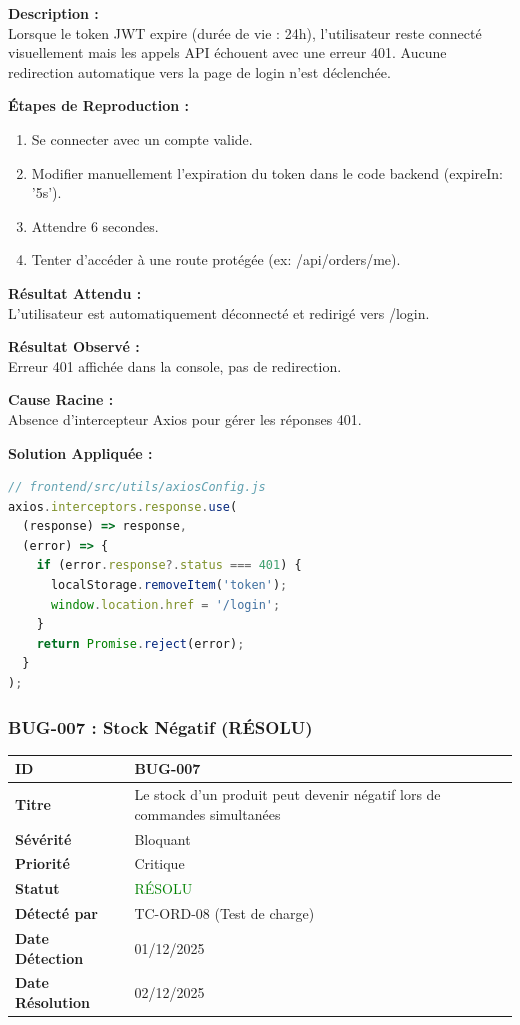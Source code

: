 \documentclass[12pt,a4paper]{article}
\begin{document}
\vspace{0.5cm}
\textbf{Description :} \\
Lorsque le token JWT expire (durée de vie : 24h), l'utilisateur reste connecté visuellement mais les appels API échouent avec une erreur 401. Aucune redirection automatique vers la page de login n'est déclenchée.

\vspace{0.5cm}
\textbf{Étapes de Reproduction :}
\begin{enumerate}
    \item Se connecter avec un compte valide.
    \item Modifier manuellement l'expiration du token dans le code backend (expireIn: '5s').
    \item Attendre 6 secondes.
    \item Tenter d'accéder à une route protégée (ex: /api/orders/me).
\end{enumerate}

\textbf{Résultat Attendu :} \\
L'utilisateur est automatiquement déconnecté et redirigé vers /login.

\vspace{0.5cm}
\textbf{Résultat Observé :} \\
Erreur 401 affichée dans la console, pas de redirection.

\vspace{0.5cm}
\textbf{Cause Racine :} \\
Absence d'intercepteur Axios pour gérer les réponses 401.

\vspace{0.5cm}
\textbf{Solution Appliquée :}
\begin{lstlisting}[language=JavaScript]
// frontend/src/utils/axiosConfig.js
axios.interceptors.response.use(
  (response) => response,
  (error) => {
    if (error.response?.status === 401) {
      localStorage.removeItem('token');
      window.location.href = '/login';
    }
    return Promise.reject(error);
  }
);
\end{lstlisting}

\subsubsection{BUG-007 : Stock Négatif (RÉSOLU)}

\begin{tabularx}{\textwidth}{|l|X|}
    \hline
    \textbf{ID} & BUG-007 \\ \hline
    \textbf{Titre} & Le stock d'un produit peut devenir négatif lors de commandes simultanées \\ \hline
    \textbf{Sévérité} & Bloquant \\ \hline
    \textbf{Priorité} & Critique \\ \hline
    \textbf{Statut} & \textcolor{green}{RÉSOLU} \\ \hline
    \textbf{Détecté par} & TC-ORD-08 (Test de charge) \\ \hline
    \textbf{Date Détection} & 01/12/2025 \\ \hline
    \textbf{Date Résolution} & 02/12/2025 \\ \hline
\end{tabularx}
\end{document}
